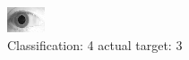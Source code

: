 \begin{figure}[h!]
\begin{center}
\includegraphics[width=0.60\columnwidth]{figures/ID1932_class_4_target_3.png}
\end{center}
\caption{ Classification: 4 actual target: 3}
\label{fig:ID1932_class_4_target_3}
\end{figure}
